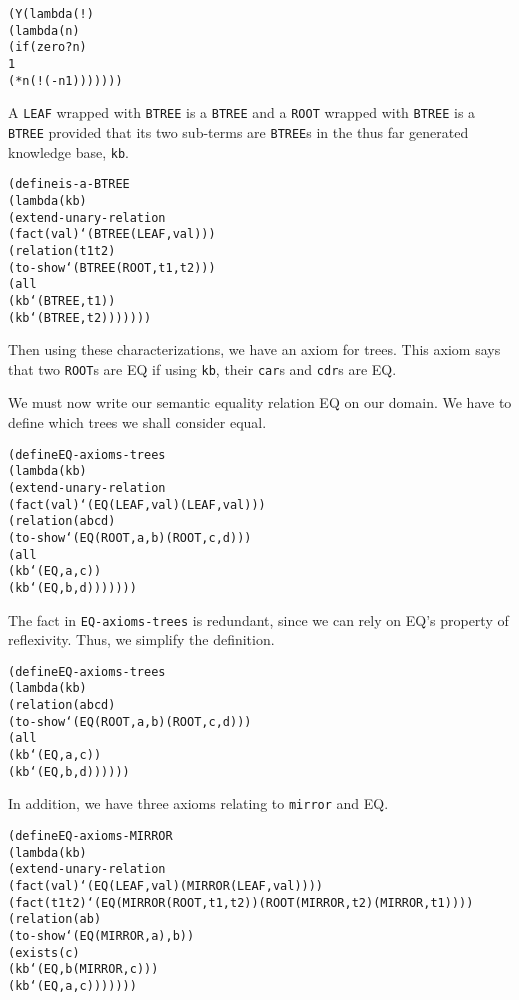 \begin{alltt}
(Y (lambda (!)
     (lambda (n)
       (if (zero? n)
         1
         (* n (! (- n 1)))))))
\end{alltt}

A \texttt{LEAF} wrapped with \texttt{BTREE} is a \texttt{BTREE} and
a \texttt{ROOT} wrapped with \texttt{BTREE} is a \texttt{BTREE}
provided that its two sub-terms are \texttt{BTREE}s in the thus far
generated knowledge base, \texttt{kb}.

\begin{alltt}
(define is-a-BTREE
  (lambda (kb)
    (extend-unary-relation
      (fact (val) `(BTREE (LEAF ,val)))
      (relation (t1 t2)
        (to-show `(BTREE (ROOT ,t1 ,t2)))
        (all
          (kb `(BTREE ,t1))
          (kb `(BTREE ,t2)))))))
\end{alltt}

Then using these characterizations, we have an axiom for trees.  This
axiom says that two \texttt{ROOT}s are EQ if using
\texttt{kb}, their \texttt{car}s and \texttt{cdr}s are EQ.

We must now write our semantic equality relation EQ on our
domain.  We have to define which trees we shall consider equal.

\begin{alltt}
(define EQ-axioms-trees
  (lambda (kb)
    (extend-unary-relation
      (fact (val) `(EQ (LEAF ,val) (LEAF ,val)))
      (relation (a b c d)
        (to-show `(EQ (ROOT ,a ,b) (ROOT ,c ,d)))
        (all
          (kb `(EQ ,a ,c))
          (kb `(EQ ,b ,d)))))))
\end{alltt}
The fact in \texttt{EQ-axioms-trees} is redundant, since we can rely
on EQ's property of reflexivity.  Thus, we simplify the
definition.

\begin{alltt}
(define EQ-axioms-trees
  (lambda (kb)
    (relation (a b c d)
      (to-show `(EQ (ROOT ,a ,b) (ROOT ,c ,d)))
      (all
        (kb `(EQ ,a ,c))
        (kb `(EQ ,b ,d))))))
\end{alltt}

In addition, we have three axioms relating to \texttt{mirror} and EQ.

\begin{alltt}
(define EQ-axioms-MIRROR
  (lambda (kb)
    (extend-unary-relation
      (fact (val) `(EQ (LEAF ,val) (MIRROR (LEAF ,val))))
      (fact (t1 t2) `(EQ (MIRROR (ROOT ,t1 ,t2)) (ROOT (MIRROR ,t2) (MIRROR ,t1))))
      (relation (a b)
        (to-show `(EQ (MIRROR ,a) ,b))
        (exists (c)
          (kb `(EQ ,b (MIRROR ,c)))
          (kb `(EQ ,a ,c)))))))
\end{alltt}

